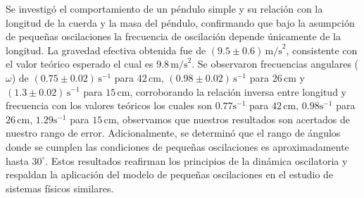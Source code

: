 \documentclass[12pt,a4]{article}
\begin{document}
Se investigó el comportamiento de un péndulo simple y su relación con la longitud de la cuerda y la masa del péndulo, confirmando que bajo la asumpción de pequeñas oscilaciones la frecuencia de oscilación depende únicamente de la longitud. La gravedad efectiva obtenida fue de \((9.5 \pm 0.6) \, \text{m/s}^2\), consistente con el valor teórico esperado el cual es \(9.8 \, \text{m/s}^2\). Se observaron frecuencias angulares (\(\omega\)) de \((0.75 \pm 0.02)\, \text{s}^{-1}\) para \(42 \, \text{cm}\), \((0.98 \pm 0.02) \, \text{s}^{-1}\) para \(26 \, \text{cm}\) y \((1.3 \pm 0.02) \, \text{s}^{-1}\) para \(15 \, \text{cm}\), corroborando la relación inversa entre longitud y frecuencia con los valores teóricos los cuales son \(0.77 \text{s}^{-1}\) para \(42 \, \text{cm}\), \(0.98 \text{s}^{-1}\) para \(26 \, \text{cm}\), \(1.29 \text{s}^{-1}\) para \(15 \, \text{cm}\), observamos que nuestros resultados son acertados de nuestro rango de error. Adicionalmente, se determinó que el rango de ángulos donde se cumplen las condiciones de pequeñas oscilaciones es aproximadamente hasta $30^\circ$. Estos resultados reafirman los principios de la dinámica oscilatoria y respaldan la aplicación del modelo de pequeñas oscilaciones en el estudio de sistemas físicos similares.
\end{document}
